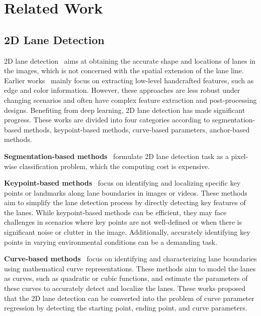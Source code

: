 \section{Related Work}
\label{sec:relatedwork}

\subsection{2D Lane Detection}
\label{subsec:2d}

2D lane detection~\cite{chen2023improving, jin2022eigenlanes, liu2021end, pan2018spatial, tabelini2021polylanenet, yang2023lane}
aims at obtaining the accurate shape and locations of lanes in the images, which is not concerned with the spatial extension of the lane line.
Earlier works~\cite{aly2008real, he2004color, kim2008robust, wang2004lane, zhou2010novel, srivastava2014improved, chanawangsa2012new}
mainly focus on extracting low-level handcrafted features, such as edge and color information.
However, these approaches are less robust under changing scenarios and often have complex feature extraction and post-processing designs.
Benefiting from deep learning, 2D lane detection has made significant progress.
These works are divided into four categories according to segmentation-based methods, keypoint-based methods, curve-based parameters, anchor-based methods.

\textbf{Segmentation-based methods}~\cite{hou2019learning, neven2018towards, pan2018spatial, qin2020ultra, dong2023hybrid, lee2023end}
formulate 2D lane detection task as a pixel-wise classification problem, which the computing cost is expensive.

\textbf{Keypoint-based methods}~\cite{ko2021key, qu2021focus, wang2022keypoint, xu2022rclane}
focus on identifying and localizing specific key points or landmarks along lane boundaries in images or videos.
These methods aim to simplify the lane detection process by directly detecting key features of the lanes.
While keypoint-based methods can be efficient, they may face challenges in scenarios where key points are not well-defined or when there is significant noise or clutter in the image.
Additionally, accurately identifying key points in varying environmental conditions can be a demanding task.

\textbf{Curve-based methods}~\cite{feng2022rethinking, tabelini2021polylanenet, chen2023improving} focus on identifying and characterizing lane boundaries using mathematical curve representations.
These methods aim to model the lanes as curves, such as quadratic or cubic functions, and estimate the parameters of these curves to accurately detect and localize the lanes.
These works proposed that the 2D lane detection can be converted into the problem of curve parameter regression by detecting the starting point, ending point, and curve parameters.

